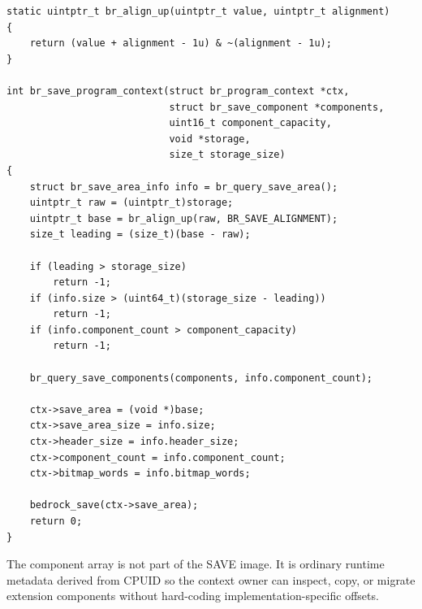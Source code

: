 \begin{verbatim}
static uintptr_t br_align_up(uintptr_t value, uintptr_t alignment)
{
    return (value + alignment - 1u) & ~(alignment - 1u);
}

int br_save_program_context(struct br_program_context *ctx,
                            struct br_save_component *components,
                            uint16_t component_capacity,
                            void *storage,
                            size_t storage_size)
{
    struct br_save_area_info info = br_query_save_area();
    uintptr_t raw = (uintptr_t)storage;
    uintptr_t base = br_align_up(raw, BR_SAVE_ALIGNMENT);
    size_t leading = (size_t)(base - raw);

    if (leading > storage_size)
        return -1;
    if (info.size > (uint64_t)(storage_size - leading))
        return -1;
    if (info.component_count > component_capacity)
        return -1;

    br_query_save_components(components, info.component_count);

    ctx->save_area = (void *)base;
    ctx->save_area_size = info.size;
    ctx->header_size = info.header_size;
    ctx->component_count = info.component_count;
    ctx->bitmap_words = info.bitmap_words;

    bedrock_save(ctx->save_area);
    return 0;
}
\end{verbatim}
\endgroup\par

The component array is not part of the SAVE image. It is ordinary runtime metadata derived from CPUID so the
context owner can inspect, copy, or migrate extension components without hard-coding implementation-specific
offsets.
